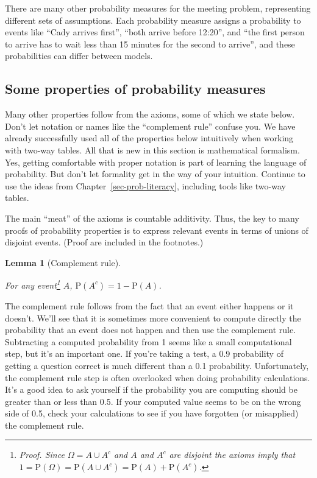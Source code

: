 \documentclass[
  letterpaper,
  DIV=11,
  numbers=noendperiod]{scrreprt}
\theoremstyle{plain}
\newtheorem{lemma}{Lemma}[chapter]
\theoremstyle{definition}
\theoremstyle{definition}
\theoremstyle{definition}
\theoremstyle{remark}
\begin{document}
There are many other probability measures for the meeting problem,
representing different sets of assumptions. Each probability measure
assigns a probability to events like ``Cady arrives first'', ``both
arrive before 12:20'', and ``the first person to arrive has to wait less
than 15 minutes for the second to arrive'', and these probabilities can
differ between models.

\subsection{Some properties of probability
measures}\label{some-properties-of-probability-measures}

Many other properties follow from the axioms, some of which we state
below. Don't let notation or names like the ``complement rule'' confuse
you. We have already successfully used all of the properties below
intuitively when working with two-way tables. All that is new in this
section is mathematical formalism. Yes, getting comfortable with proper
notation is part of learning the language of probability. But don't let
formality get in the way of your intuition. Continue to use the ideas
from Chapter~\ref{sec-prob-literacy}, including tools like two-way
tables.

The main ``meat'' of the axioms is countable additivity. Thus, the key
to many proofs of probability properties is to express relevant events
in terms of unions of disjoint events. (Proof are included in the
footnotes.)

\begin{lemma}[Complement
rule]\protect\hypertarget{lem-complement-rule}{}\label{lem-complement-rule}

 For any event\footnote{\emph{Proof.} Since
  \(\Omega = A \cup A^c\) and \(A\) and \(A^c\) are disjoint the axioms
  imply that
  \(1=\textrm{P}(\Omega) = \textrm{P}(A \cup A^c) = \textrm{P}(A) + \textrm{P}(A^c)\).}
\(A\), \(\textrm{P}(A^c) = 1 - \textrm{P}(A)\).

\end{lemma}

The complement rule follows from the fact that an event either happens
or it doesn't. We'll see that it is sometimes more convenient to compute
directly the probability that an event does not happen and then use the
complement rule. Subtracting a computed probability from 1 seems like a
small computational step, but it's an important one. If you're taking a
test, a 0.9 probability of getting a question correct is much different
than a 0.1 probability. Unfortunately, the complement rule step is often
overlooked when doing probability calculations. It's a good idea to ask
yourself if the probability you are computing should be greater than or
less than 0.5. If your computed value seems to be on the wrong side of
0.5, check your calculations to see if you have forgotten (or
misapplied) the complement rule.
\end{document}
